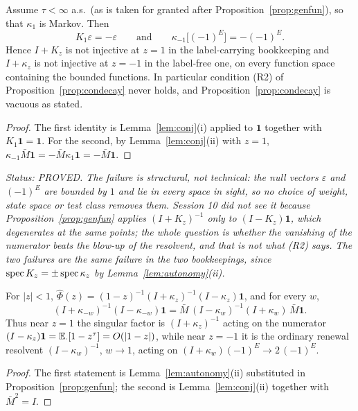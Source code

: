 \begin{proposition}[failure of (R2)]\label{prop:r2false}
Assume $\tau<\infty$ a.s.\ (as is taken for granted after
Proposition~\ref{prop:genfun}), so that $\kappa_1$ is Markov.  Then
\[
K_1\varepsilon=-\varepsilon
\qquad\text{and}\qquad
\kappa_{-1}\bigl[(-1)^{E}\bigr]=-(-1)^{E} .
\]
Hence $I+K_z$ is not injective at $z=1$ in the label-carrying
bookkeeping and $I+\kappa_z$ is not injective at $z=-1$ in the
label-free one, on every function space containing the bounded
functions.  In particular condition (R2) of
Proposition~\ref{prop:condecay} never holds, and
Proposition~\ref{prop:condecay} is vacuous as stated.
\end{proposition}

\begin{proof}
The first identity is Lemma~\ref{lem:conj}(i) applied to $\mathbf 1$
together with $K_1\mathbf 1=\mathbf 1$.  For the second, by
Lemma~\ref{lem:conj}(ii) with $z=1$,
$\kappa_{-1}\bar M\mathbf 1=-\bar M\kappa_1\mathbf 1=-\bar M\mathbf 1$.
\end{proof}

\emph{Status: PROVED.  The failure is structural, not technical: the
null vectors $\varepsilon$ and $(-1)^E$ are bounded by $1$ and lie in
every space in sight, so no choice of weight, state space or test class
removes them.  Session 10 did not see it because
Proposition~\ref{prop:genfun} applies $(I+K_z)^{-1}$ only to
$(I-K_z)\mathbf 1$, which degenerates at the same points; the whole
question is whether the vanishing of the numerator beats the blow-up of
the resolvent, and that is not what (R2) says.  The two failures are
the same failure in the two bookkeepings, since
$\operatorname{spec} K_z=\pm\operatorname{spec}\kappa_z$ by Lemma~\ref{lem:autonomy}(ii).}

\begin{proposition}\label{prop:repair}
For $|z|<1$,
$\widehat\Phi(z)=(1-z)^{-1}(I+\kappa_z)^{-1}(I-\kappa_z)\mathbf 1$, and
for every $w$,
\[
(I+\kappa_{-w})^{-1}(I-\kappa_{-w})\mathbf 1
=\bar M\,(I-\kappa_{w})^{-1}(I+\kappa_{w})\,\bar M\mathbf 1 .
\]
Thus near $z=1$ the singular factor is $(I+\kappa_z)^{-1}$ acting on
the numerator $(I-\kappa_z)\mathbf 1=\mathbb{E}_\cdot[1-z^\tau]=O(|1-z|)$,
while near $z=-1$ it is the ordinary renewal resolvent
$(I-\kappa_w)^{-1}$, $w\to1$, acting on
$(I+\kappa_w)(-1)^{E}\to2\,(-1)^{E}$.
\end{proposition}

\begin{proof}
The first statement is Lemma~\ref{lem:autonomy}(ii) substituted in
Proposition~\ref{prop:genfun}; the second is Lemma~\ref{lem:conj}(ii)
together with $\bar M^2=I$.
\end{proof}

